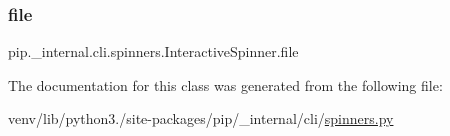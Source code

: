 \subsubsection{\texorpdfstring{file}{file}}
{\footnotesize\ttfamily pip.\+\_\+internal.\+cli.\+spinners.\+Interactive\+Spinner.\+file\hspace{0.3cm}{\ttfamily [static]}}



The documentation for this class was generated from the following file\+:\begin{DoxyCompactItemize}
\item 
venv/lib/python3./site-\/packages/pip/\+\_\+internal/cli/\hyperlink{spinners_8py}{spinners.\+py}\end{DoxyCompactItemize}
